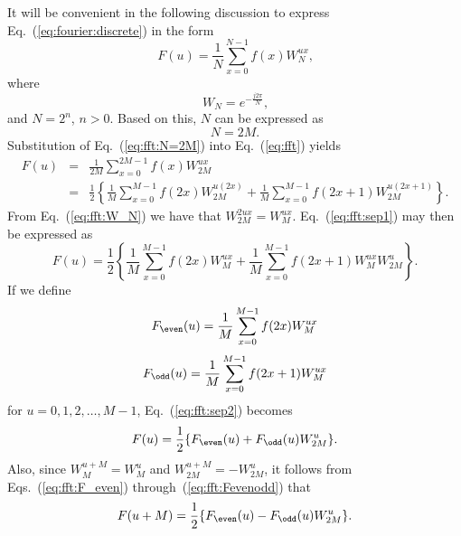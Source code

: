 It will be convenient in the following discussion to express
Eq.~(\ref{eq:fourier:discrete}) in the form
\begin{equation}
\label{eq:fft}
  F(u)=\frac{1}{N}\sum_{x=0}^{N-1}f(x)W_{N}^{ux}\mbox{,}
\end{equation}
where
\begin{equation}
\label{eq:fft:W_N}
  W_{N}=e^{-\frac{j2\pi}{N}}\mbox{,}
\end{equation}
and $N=2^{n}$, $n>0$.  Based on this, $N$ can be expressed as
\begin{equation}
\label{eq:fft:N=2M}
  N=2M\mbox{.}
\end{equation}
Substitution of Eq.~(\ref{eq:fft:N=2M}) into Eq.~(\ref{eq:fft})
yields 
\begin{eqnarray}
\label{eq:fft:sep1}
  F(u) & = & \frac{1}{2M}\sum_{x=0}^{2M-1}f(x)W_{2M}^{ux}\nonumber\\
       & = & \frac{1}{2}\left\{\frac{1}{M}\sum_{x=0}^{M-1}
             f(2x)W_{2M}^{u(2x)}+
             \frac{1}{M}\sum_{x=0}^{M-1}
             f(2x+1)W_{2M}^{u(2x+1)}\right\}\mbox{.}
\end{eqnarray}
From Eq.~(\ref{eq:fft:W_N}) we have that $W_{2M}^{2ux}=W_{M}^{ux}$.
Eq.~(\ref{eq:fft:sep1}) may then be expressed as
\begin{equation}
\label{eq:fft:sep2}
  F(u)=\frac{1}{2}\left\{\frac{1}{M}\sum_{x=0}^{M-1}f(2x)W_{M}^{ux}+
  \frac{1}{M}\sum_{x=0}^{M-1}f(2x+1)W_{M}^{ux}W_{2M}^{u}\right\}\mbox{.}
\end{equation}
If we define
\begin{equation}
\label{eq:fft:F_even}
  F_{\even}(u)=\frac{1}{M}\sum_{x=0}^{M-1}f(2x)W_{M}^{ux}
\end{equation}
\begin{equation}
\label{eq:fft:F_odd}
  F_{\odd}(u)=\frac{1}{M}\sum_{x=0}^{M-1}f(2x+1)W_{M}^{ux}
\end{equation}
for $u=0,1,2,\ldots,M-1$, Eq.~(\ref{eq:fft:sep2}) becomes
\begin{equation}
\label{eq:fft:Fevenodd}
  F(u)=\frac{1}{2}\{F_{\even}(u)+F_{\odd}(u)W_{2M}^{u}\}\mbox{.}
\end{equation}
Also, since $W_{M}^{u+M}=W_{M}^{u}$ and $W_{2M}^{u+M}=-W_{2M}^{u}$, it
follows from Eqs.~(\ref{eq:fft:F_even})
through~(\ref{eq:fft:Fevenodd}) that
\begin{equation}
\label{eq:fft:doubling}
  F(u+M)=\frac{1}{2}\{F_{\even}(u)-F_{\odd}(u)W_{2M}^{u}\}\mbox{.}
\end{equation}

